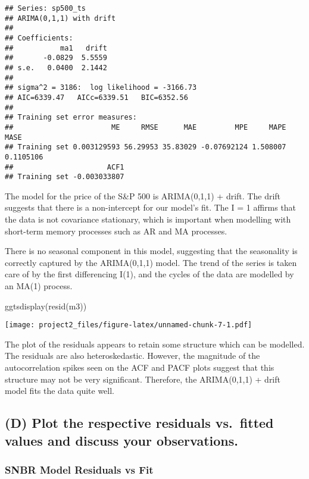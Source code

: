\documentclass[
  10.5pt,
]{article}
\newenvironment{Shaded}{\begin{snugshade}}{\end{snugshade}}
\newcommand{\FunctionTok}[1]{\textcolor[rgb]{0.00,0.00,0.00}{#1}}
\newcommand{\NormalTok}[1]{#1}
\begin{document}
\begin{verbatim}
## Series: sp500_ts 
## ARIMA(0,1,1) with drift 
## 
## Coefficients:
##           ma1   drift
##       -0.0829  5.5559
## s.e.   0.0400  2.1442
## 
## sigma^2 = 3186:  log likelihood = -3166.73
## AIC=6339.47   AICc=6339.51   BIC=6352.56
## 
## Training set error measures:
##                       ME     RMSE      MAE         MPE     MAPE      MASE
## Training set 0.003129593 56.29953 35.83029 -0.07692124 1.508007 0.1105106
##                      ACF1
## Training set -0.003033807
\end{verbatim}

The model for the price of the S\&P 500 is ARIMA(0,1,1) + drift. The
drift suggests that there is a non-intercept for our model's fit. The I
= 1 affirms that the data is not covariance stationary, which is
important when modelling with short-term memory processes such as AR and
MA processes.

There is no seasonal component in this model, suggesting that the
seasonality is correctly captured by the ARIMA(0,1,1) model. The trend
of the series is taken care of by the first differencing I(1), and the
cycles of the data are modelled by an MA(1) process.

\begin{Shaded}
\begin{Highlighting}[]
\FunctionTok{ggtsdisplay}\NormalTok{(}\FunctionTok{resid}\NormalTok{(m3))}
\end{Highlighting}
\end{Shaded}

\texttt{[image: project2\_files/figure-latex/unnamed-chunk-7-1.pdf]}

The plot of the residuals appears to retain some structure which can be
modelled. The residuals are also heteroskedastic. However, the magnitude
of the autocorrelation spikes seen on the ACF and PACF plots suggest
that this structure may not be very significant. Therefore, the
ARIMA(0,1,1) + drift model fits the data quite well.

\hypertarget{d-plot-the-respective-residuals-vs.-fitted-values-and-discuss-your-observations.}{%
\subsection{(D) Plot the respective residuals vs.~fitted values and
discuss your
observations.}\label{d-plot-the-respective-residuals-vs.-fitted-values-and-discuss-your-observations.}}

\hypertarget{snbr-model-residuals-vs-fit}{%
\subsubsection{SNBR Model Residuals vs
Fit}\label{snbr-model-residuals-vs-fit}}
\end{document}
